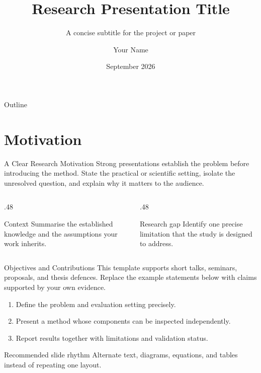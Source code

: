 \documentclass[aspectratio=169,11pt]{beamer}
\title[CUHK Beamer Template]{Research Presentation Title}
\subtitle{A concise subtitle for the project or paper}
\author[Your Name]{Your Name}
\institute[CUHK]{Department or Programme\\The Chinese University of Hong Kong}
\date{September 2026}
\begin{document}
\begin{frame}[plain]
  \titlepage
\end{frame}

\begin{frame}{Outline}
  \tableofcontents
\end{frame}

\section{Motivation}

\begin{frame}{A Clear Research Motivation}
  Strong presentations establish the problem before introducing the method. State the
  practical or scientific setting, isolate the unresolved question, and explain why it
  matters to the audience.

  \vspace{0.45cm}
  \begin{columns}[T,onlytextwidth]
    \begin{column}{.48\textwidth}
      \begin{block}{Context}
        Summarise the established knowledge and the assumptions your work inherits.
      \end{block}
    \end{column}
    \begin{column}{.48\textwidth}
      \begin{alertblock}{Research gap}
        Identify one precise limitation that the study is designed to address.
      \end{alertblock}
    \end{column}
  \end{columns}

  \vspace{0.25cm}
\end{frame}

\begin{frame}{Objectives and Contributions}
  This template supports short talks, seminars, proposals, and thesis defences. Replace
  the example statements below with claims supported by your own evidence.

  \vspace{0.35cm}
  \begin{enumerate}
    \item Define the problem and evaluation setting precisely.
    \item Present a method whose components can be inspected independently.
    \item Report results together with limitations and validation status.
  \end{enumerate}

  \vspace{0.25cm}
  \begin{exampleblock}{Recommended slide rhythm}
    Alternate text, diagrams, equations, and tables instead of repeating one layout.
  \end{exampleblock}
\end{frame}
\end{document}
